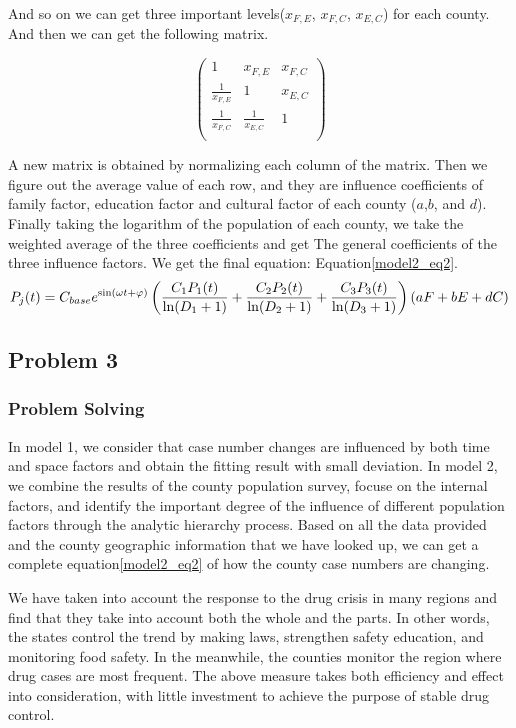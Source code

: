 \documentclass{mcmthesis}
\begin{document}
And so on we can get three important levels($x_{F,E}$, $x_{F,C}$, $x_{E,C}$) for each county. And then we can get the following matrix.

\[
\begin{pmatrix}
{1 } & {x_{F,E} } & {x_{F,C} }  \\
{\frac{1}{x_{F,E}}} & {1 } & {x_{E,C} }  \\
{\frac{1}{x_{F,C} } } & {\frac{1}{x_{E,C}} } & {1}  \\
\end{pmatrix}
\]

A new matrix is obtained by normalizing each column of the matrix. Then we figure out the average value of each row, and they are influence coefficients of family factor, education factor and cultural factor of each county ($a$,$b$, and $d$). Finally taking the logarithm of the population of each county, we take the weighted average of the three coefficients and get The general coefficients of the three influence factors. We get the final equation: Equation\eqref{model2_eq2}.
\begin{equation}
P_{j}(t) = C_{base} e^{\sin (\omega t+\varphi)} \left(\frac{C_1 P_1(t)}{\ln (D_1+1)}+\frac{C_2 P_2(t)}{\ln (D_2+1)}+\frac{C_3 P_3(t)}{\ln (D_3+1)}\right)\left(a\*F+b\*E+d\*C\right)
\label{model2_eq2}
\end{equation}

\subsection{Problem 3}
\subsubsection{Problem Solving}
In model 1, we consider that case number changes are influenced by both time and space factors and obtain the fitting result with small deviation. In model 2, we combine the results of the county population survey, focuse on the internal factors, and identify the important degree of the influence of different population factors through the analytic hierarchy process. Based on all the data provided and the county geographic information that we have looked up, we can get a complete equation\eqref{model2_eq2} of how the county case numbers are changing.

We have taken into account the response to the drug crisis in many regions and find that they take into account both the whole and the parts. In other words, the states control the trend by making laws, strengthen safety education, and monitoring food safety. In the meanwhile, the counties monitor the region where drug cases are most frequent. The above measure takes both efficiency and effect into consideration, with little investment to achieve the purpose of stable drug control.
\end{document}
